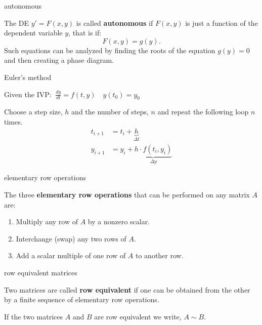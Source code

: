 \documentclass[avery5371,grid]{flashcards}
\newcommand{\defn}[1]{\textbf{#1}}
\begin{document}
\begin{flashcard}[Definition]{autonomous}

  The DE $y' = F(x,y)$ is called \defn{autonomous} if $F(x,y)$ is just
  a function of the dependent variable $y$, that is if:
  \[
    F(x,y) = g(y).
  \]
  Such equations can be analyzed by finding the roots of the equation
  $g(y)=0$ and then creating a phase diagram.

\end{flashcard}

\begin{flashcard}[Algorith]{Euler's method}

  Given the IVP: \( \: \frac{dy}{dt} = f(t,y) \quad y(t_0) = y_0 \)
  \smallskip

  Choose a step size, $h$ and the number of steps, $n$ and repeat the
  following loop $n$ times.
  \begin{align*}
    t_{i+1} &= t_i + \underbrace{h}_{\Delta t} \\
    y_{i+1} &= y_i + \underbrace{h \cdot f(t_i, y_i)}_{\Delta y}
  \end{align*}

\end{flashcard}

\begin{flashcard}[Definition]{elementary row operations}

  The three \defn{elementary row operations} that can be performed on
  any matrix $A$ are:
  \begin{enumerate}
  \item Multiply any row of $A$ by a nonzero scalar.
  \item Interchange (swap) any two rows of $A$.
  \item Add a scalar multiple of one row of $A$ to another row.
  \end{enumerate}

\end{flashcard}

\begin{flashcard}[Definition]{row equivalent matrices}

  Two matrices are called \defn{row equivalent} if one can be obtained
  from the other by a finite sequence of elementary row operations.

  \medskip

  If the two matrices $A$ and $B$ are row equivalent we write,
  $A \sim B$.

\end{flashcard}
\end{document}
